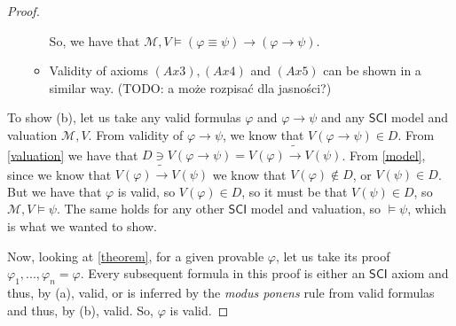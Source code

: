 \documentclass{article}
\theoremstyle{definition}
\theoremstyle{definition}
\theoremstyle{definition}
\theoremstyle{definition}
\theoremstyle{definition}
\newcommand*{\id}{\equiv}
\newcommand*{\ra}{\rightarrow}
\newcommand{\SCI}{$\mathsf{SCI}$\xspace}
\begin{document}
\begin{proof}
\begin{itemize}
\begin{itemize}
                        So, we have that $\mathcal{M}, V \models (\varphi \id \psi) \ra (\varphi \ra
                            \psi)$.

                  \item Validity of axioms $(Ax3), (Ax4)$ and $(Ax5)$ can be shown in a similar way.
                            {\color{red}(TODO: a może rozpisać dla jasności?)}
              \end{itemize}
    \end{itemize}

    To show (b), let us take any valid formulas $\varphi$ and $\varphi \ra \psi$
    and any \SCI model and valuation $\mathcal{M}, V$. From validity of $\varphi
        \ra \psi$, we know that $V(\varphi \ra \psi) \in D$. From \cref{valuation} we
    have that $D \ni V(\varphi \ra \psi) = V(\varphi) \tilde{\ra} V(\psi)$. From
    \cref{model}, since we know that $V(\varphi) \tilde{\ra} V(\psi)$ we know that
    $V(\varphi) \not \in D$, or $V(\psi) \in D$. But we have that $\varphi$ is
    valid, so $V(\varphi) \in D$, so it must be that $V(\psi) \in D$, so
    $\mathcal{M}, V \models \psi$. The same holds for any other \SCI model and
    valuation, so $\models \psi$, which is what we wanted to show.

    Now, looking at \cref{theorem}, for a given provable $\varphi$, let us take its
    proof $\varphi_1, ..., \varphi_n = \varphi$. Every subsequent formula in this
    proof is either an \SCI axiom and thus, by (a), valid, or is inferred by the
    \emph{modus ponens} rule from valid formulas and thus, by (b), valid. So,
    $\varphi$ is valid.
\end{proof}
\end{document}
